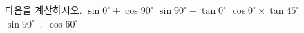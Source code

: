 다음을 계산하시오.
 $\sin 0^\circ+\cos 90^\circ$
 $\sin 90^\circ-\tan 0^\circ$
 $\cos 0^\circ\times\tan 45^\circ$
 $\sin 90^\circ\div\cos 60^\circ$
